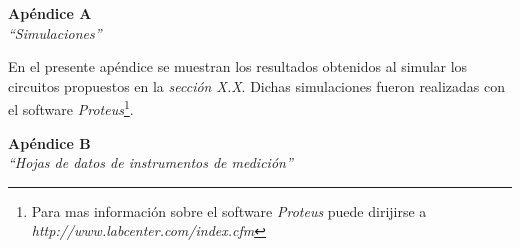 \documentclass{article}
\begin{document}

\newpage
\vspace*{4cm}
\begin{center}
	\textbf{\Huge{Apéndice A}} \\
	\bigskip\bigskip
	\Large{\textit{``Simulaciones''}}
\end{center}


\newpage \textit{}
\newpage

	En el presente apéndice se muestran los resultados obtenidos al simular los circuitos propuestos en la \textit{sección X.X}. Dichas simulaciones fueron realizadas con el software \textit{Proteus}\footnote{Para mas información sobre el software \textit{Proteus} puede dirijirse a \textit{http://www.labcenter.com/index.cfm}}.
\bigskip \bigskip





\newpage
\vspace*{4cm}
\begin{center}
	\textbf{\Huge{Apéndice B}} \\
	\bigskip\bigskip
	\Large{\textit{``Hojas de datos de instrumentos de medición''}}
\end{center}
\end{document}
